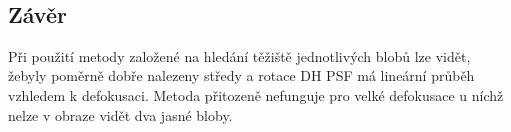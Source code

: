 \documentclass[11pt]{article}
\begin{document}
    \begin{center}
    \end{center}
    { \hspace*{\fill} \\}
    
    \hypertarget{zuxe1vux11br}{%
\subsection{Závěr}\label{zuxe1vux11br}}

Při použití metody založené na hledání těžiště jednotlivých blobů lze
vidět, žebyly poměrně dobře nalezeny středy a rotace DH PSF má lineární
průběh vzhledem k defokusaci. Metoda přitozeně nefunguje pro velké
defokusace u níchž nelze v obraze vidět dva jasné bloby.


    
    
    
\end{document}
